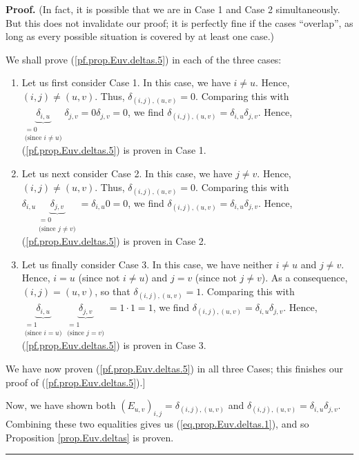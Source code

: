 \documentclass[numbers=enddot,12pt,final,onecolumn,notitlepage]{scrartcl}%
\theoremstyle{definition}
\newenvironment{proof}[1][Proof]{\noindent\textbf{#1.} }{\ \rule{0.5em}{0.5em}}
\begin{document}
\begin{proof}
(In fact, it is possible that we are in Case 1 and Case 2 simultaneously. But
this does not invalidate our proof; it is perfectly fine if the cases
\textquotedblleft overlap\textquotedblright, as long as every possible
situation is covered by at least one case.)

We shall prove (\ref{pf.prop.Euv.deltas.5}) in each of the three cases:

\begin{enumerate}
\item Let us first consider Case 1. In this case, we have $i\neq u$. Hence,
$\left(  i,j\right)  \neq\left(  u,v\right)  $. Thus, $\delta_{\left(
i,j\right)  ,\left(  u,v\right)  }=0$. Comparing this with $\underbrace{\delta
_{i,u}}_{\substack{=0\\\text{(since }i\neq u\text{)}}}\delta_{j,v}%
=0\delta_{j,v}=0$, we find $\delta_{\left(  i,j\right)  ,\left(  u,v\right)
}=\delta_{i,u}\delta_{j,v}$. Hence, (\ref{pf.prop.Euv.deltas.5}) is proven in
Case 1.

\item Let us next consider Case 2. In this case, we have $j\neq v$. Hence,
$\left(  i,j\right)  \neq\left(  u,v\right)  $. Thus, $\delta_{\left(
i,j\right)  ,\left(  u,v\right)  }=0$. Comparing this with $\delta
_{i,u}\underbrace{\delta_{j,v}}_{\substack{=0\\\text{(since }j\neq v\text{)}%
}}=\delta_{i,u}0=0$, we find $\delta_{\left(  i,j\right)  ,\left(  u,v\right)
}=\delta_{i,u}\delta_{j,v}$. Hence, (\ref{pf.prop.Euv.deltas.5}) is proven in
Case 2.

\item Let us finally consider Case 3. In this case, we have neither $i\neq u$
and $j\neq v$. Hence, $i=u$ (since not $i\neq u$) and $j=v$ (since not $j\neq
v$). As a consequence, $\left(  i,j\right)  =\left(  u,v\right)  $, so that
$\delta_{\left(  i,j\right)  ,\left(  u,v\right)  }=1$. Comparing this with
$\underbrace{\delta_{i,u}}_{\substack{=1\\\text{(since }i=u\text{)}%
}}\underbrace{\delta_{j,v}}_{\substack{=1\\\text{(since }j=v\text{)}}%
}=1\cdot1=1$, we find $\delta_{\left(  i,j\right)  ,\left(  u,v\right)
}=\delta_{i,u}\delta_{j,v}$. Hence, (\ref{pf.prop.Euv.deltas.5}) is proven in
Case 3.
\end{enumerate}

We have now proven (\ref{pf.prop.Euv.deltas.5}) in all three Cases; this
finishes our proof of (\ref{pf.prop.Euv.deltas.5}).]

Now, we have shown both $\left(  E_{u,v}\right)  _{i,j}=\delta_{\left(
i,j\right)  ,\left(  u,v\right)  }$ and $\delta_{\left(  i,j\right)  ,\left(
u,v\right)  }=\delta_{i,u}\delta_{j,v}$. Combining these two equalities gives
us (\ref{eq.prop.Euv.deltas.1}), and so Proposition \ref{prop.Euv.deltas} is proven.
\end{proof}
\end{document}
